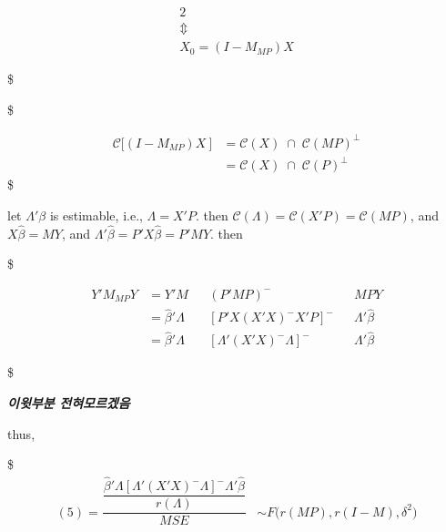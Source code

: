 \documentclass[
]{book}
\begin{document}
{{{\begin{alignat}{2}
\\

\Updownarrow

\\




X_0 = (I-M_{MP})X








\end{alignat}

\$

\$

\begin{align}

\mathcal{C} \Big[ (I-M_{MP})X \ \Big] 


&= \mathcal{C} (X) \; \cap \; \mathcal{C} (MP)^\perp \\

&= \mathcal{C} (X) \; \cap \; \mathcal{C} (P)^\perp \tag{EXAMPLE 3.3.4.: pp.66–67}


\end{align}
\$

let \(\Lambda ' \beta\) is estimable, i.e., \(\Lambda = X'P\). then \(\mathcal{C}(\Lambda) = \mathcal{C}(X'P) =\mathcal{C}(MP)\), and \(X \hat \beta = MY\), and \(\Lambda ' \hat \beta = P' X \hat \beta = P' M Y\). then

\$

\begin{align}

Y' M_{MP}Y &= Y' M && (P'  M  P)^- && MPY




\\

&= \hat \beta ' \Lambda  && [P' X(X'X)^-X' P]^- && \Lambda ' \hat \beta

\\

&= \hat \beta ' \Lambda  && [\Lambda' (X'X)^- \Lambda]^- && \Lambda ' \hat \beta






\end{align}

\$

\textbf{\emph{이윗부분 전혀모르겠음}}

thus,

\$
\begin{align}
(5) = \dfrac{\dfrac{\hat \beta ' \Lambda [\Lambda ' (X'X)^- \Lambda]^- \Lambda' \hat \beta}{r(\Lambda)}}{MSE} &\sim F \Big( r(MP), r(I-M), \delta^2 \Big)\\



\end{align}}}}
\end{document}
